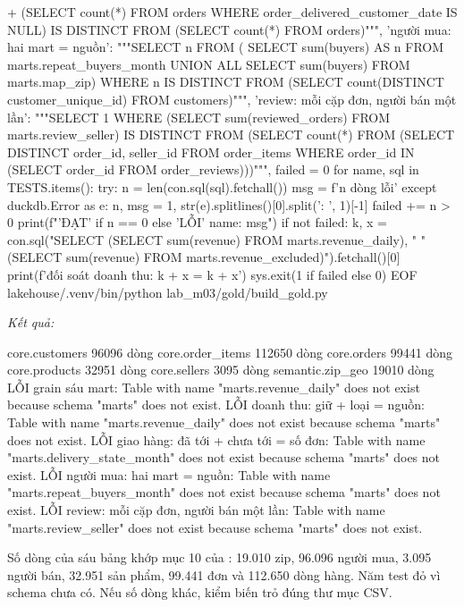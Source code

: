 \begin{codeblock}
{     + (SELECT count(*) FROM orders WHERE order_delivered_customer_date IS NULL)
     IS DISTINCT FROM (SELECT count(*) FROM orders)""",
  'người mua: hai mart = nguồn': """SELECT n FROM (
     SELECT sum(buyers) AS n FROM marts.repeat_buyers_month
     UNION ALL SELECT sum(buyers) FROM marts.map_zip)
     WHERE n IS DISTINCT FROM (SELECT count(DISTINCT customer_unique_id)
                               FROM customers)""",
  'review: mỗi cặp đơn, người bán một lần': """SELECT 1 WHERE
     (SELECT sum(reviewed_orders) FROM marts.review_seller)
     IS DISTINCT FROM (SELECT count(*) FROM (SELECT DISTINCT order_id, seller_id
       FROM order_items WHERE order_id IN (SELECT order_id FROM order_reviews)))""",
}
failed = 0
for name, sql in TESTS.items():
    try:
        n = len(con.sql(sql).fetchall())
        msg = f'{n} dòng lỗi'
    except duckdb.Error as e:
        n, msg = 1, str(e).splitlines()[0].split(': ', 1)[-1]
    failed += n > 0
    print(f"{'ĐẠT' if n == 0 else 'LỖI'}  {name}: {msg}")
if not failed:
    k, x = con.sql("SELECT (SELECT sum(revenue) FROM marts.revenue_daily), "
                   "(SELECT sum(revenue) FROM marts.revenue_excluded)").fetchall()[0]
    print(f'đối soát doanh thu: {k} + {x} = {k + x}')
sys.exit(1 if failed else 0)
EOF
lakehouse/.venv/bin/python lab_m03/gold/build_gold.py
\end{codeblock}
\textit{Kết quả:}
\begin{codeblock}
core.customers                 96096 dòng
core.order_items              112650 dòng
core.orders                    99441 dòng
core.products                  32951 dòng
core.sellers                    3095 dòng
semantic.zip_geo               19010 dòng
LỖI  grain sáu mart: Table with name "marts.revenue_daily" does not exist because schema "marts" does not exist.
LỖI  doanh thu: giữ + loại = nguồn: Table with name "marts.revenue_daily" does not exist because schema "marts" does not exist.
LỖI  giao hàng: đã tới + chưa tới = số đơn: Table with name "marts.delivery_state_month" does not exist because schema "marts" does not exist.
LỖI  người mua: hai mart = nguồn: Table with name "marts.repeat_buyers_month" does not exist because schema "marts" does not exist.
LỖI  review: mỗi cặp đơn, người bán một lần: Table with name "marts.review_seller" does not exist because schema "marts" does not exist.
\end{codeblock}

Số dòng của sáu bảng khớp mục 10 của : 19.010 zip, 96.096 người mua, 3.095 người bán, 32.951 sản phẩm, 99.441 đơn và 112.650 dòng hàng. Năm test đỏ vì schema  chưa có. Nếu số dòng khác, kiểm biến  trỏ đúng thư mục CSV.

